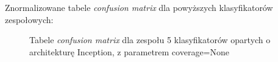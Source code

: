 \documentclass[polish,12pt]{aghthesis}
\begin{document}
\newpage
\noindent Znormalizowane tabele \textit{confusion matrix} dla powyższych klasyfikatorów zespołowych:
\begin{figure}[h!]%
    \begin{adjustbox}{minipage=1.0\paperwidth, pagecenter}
    \centering
    \qquad
    \end{adjustbox}
    \label{fig:inc-ens-5-None-matrices}
    \caption{Tabele \textit{confusion matrix} dla zespołu 5 klasyfikatorów opartych o architekturę Inception, z parametrem coverage=None}
\end{figure}
\end{document}
